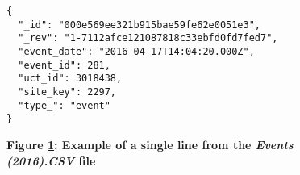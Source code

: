 \begin{figure}[H]
  \centering
  \begin{mdframed}
    \centering
    \begin{verbatim}
{
  "_id": "000e569ee321b915bae59fe62e0051e3",
  "_rev": "1-7112afce121087818c33ebfd0fd7fed7",
  "event_date": "2016-04-17T14:04:20.000Z",
  "event_id": 281,
  "uct_id": 3018438,
  "site_key": 2297,
  "type_": "event"
}           
        \end{verbatim}
  \end{mdframed}
  \caption[Event Document JSON Sample]{\textbf{Figure \ref{fig-events-json-sample}: Example of a single line from the \textit{Events (2016).CSV} file}}
  \label{fig-events-json-sample}
\end{figure}